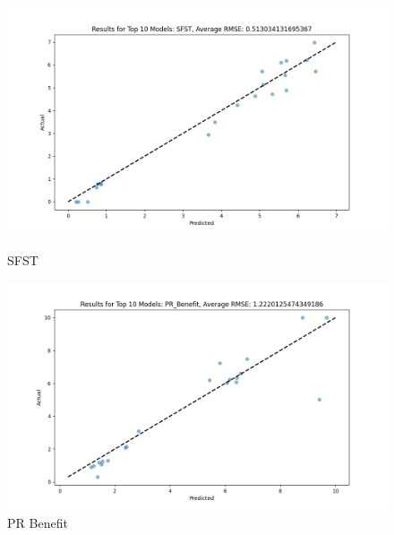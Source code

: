 \begin{figure}[H]
    \centering
    \begin{minipage}{0.495\textwidth}
        \centering
        \includegraphics[width=\linewidth]{reg_section_all/images_reg_ensemble/ensemble_learning_rmse_plot_top_10_Models_SFST.png}
        \caption{SFST}
        \label{fig:sfst_ensemble}
    \end{minipage}\hfill
    \begin{minipage}{0.495\textwidth}
        \centering
        \includegraphics[width=\linewidth]{reg_section_all/images_reg_ensemble/ensemble_learning_rmse_plot_top_10_Models_PR_Benefit.png}
        \caption{PR Benefit}
        \label{fig:pr_ben_ensemble}
    \end{minipage}
\end{figure}

